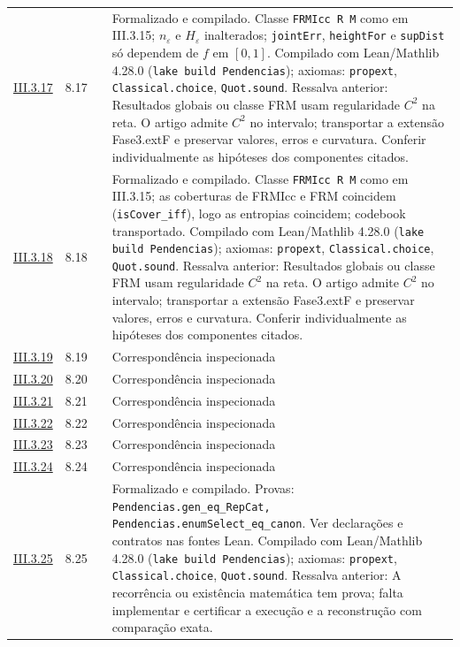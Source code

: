 \documentclass[12pt,a4paper]{article}
\theoremstyle{preciso}
\theoremstyle{definition}
\newcommand{\code}[1]{\nolinkurl{#1}}
\theoremstyle{preciso}
\theoremstyle{preciso}
\theoremstyle{preciso}
\theoremstyle{preciso}
\theoremstyle{definition}
\theoremstyle{preciso}
\theoremstyle{definition}
\theoremstyle{preciso}
\theoremstyle{preciso}
\theoremstyle{definition}
\begin{document}
\begin{singlespace}
\begin{longtable}{@{}p{.11\linewidth}p{.09\linewidth}p{.09\linewidth}p{.59\linewidth}@{}}
\hyperref[map:artigo_2:3.17]{III.3.17} & 8.17 & \pageref{map:artigo_2:3.17} & Formalizado e compilado. Classe \texttt{FRMIcc R M} como em III.3.15; $n_\varepsilon$ e $H_\varepsilon$ inalterados; \texttt{jointErr}, \texttt{heightFor} e \texttt{supDist} só dependem de $f$ em $[0,1]$. Compilado com Lean/Mathlib 4.28.0 (\texttt{lake build Pendencias}); axiomas: \texttt{propext}, \texttt{Classical.choice}, \texttt{Quot.sound}. Ressalva anterior: Resultados globais ou classe FRM usam regularidade $C^2$ na reta. O artigo admite $C^2$ no intervalo; transportar a extensão Fase3.extF e preservar valores, erros e curvatura. Conferir individualmente as hipóteses dos componentes citados.\\[4pt]
\hyperref[map:artigo_2:3.18]{III.3.18} & 8.18 & \pageref{map:artigo_2:3.18} & Formalizado e compilado. Classe \texttt{FRMIcc R M} como em III.3.15; as coberturas de FRMIcc e FRM coincidem (\texttt{isCover\_iff}), logo as entropias coincidem; codebook transportado. Compilado com Lean/Mathlib 4.28.0 (\texttt{lake build Pendencias}); axiomas: \texttt{propext}, \texttt{Classical.choice}, \texttt{Quot.sound}. Ressalva anterior: Resultados globais ou classe FRM usam regularidade $C^2$ na reta. O artigo admite $C^2$ no intervalo; transportar a extensão Fase3.extF e preservar valores, erros e curvatura. Conferir individualmente as hipóteses dos componentes citados.\\[4pt]
\hyperref[map:artigo_2:3.19]{III.3.19} & 8.19 & \pageref{map:artigo_2:3.19} & Correspondência inspecionada\\[4pt]
\hyperref[map:artigo_2:3.20]{III.3.20} & 8.20 & \pageref{map:artigo_2:3.20} & Correspondência inspecionada\\[4pt]
\hyperref[map:artigo_2:3.21]{III.3.21} & 8.21 & \pageref{map:artigo_2:3.21} & Correspondência inspecionada\\[4pt]
\hyperref[map:artigo_2:3.22]{III.3.22} & 8.22 & \pageref{map:artigo_2:3.22} & Correspondência inspecionada\\[4pt]
\hyperref[map:artigo_2:3.23]{III.3.23} & 8.23 & \pageref{map:artigo_2:3.23} & Correspondência inspecionada\\[4pt]
\hyperref[map:artigo_2:3.24]{III.3.24} & 8.24 & \pageref{map:artigo_2:3.24} & Correspondência inspecionada\\[4pt]
\hyperref[map:artigo_2:3.25]{III.3.25} & 8.25 & \pageref{map:artigo_2:3.25} & Formalizado e compilado. Provas: \code{Pendencias.gen_eq_RepCat, Pendencias.enumSelect_eq_canon}. Ver declarações e contratos nas fontes Lean. Compilado com Lean/Mathlib 4.28.0 (\texttt{lake build Pendencias}); axiomas: \texttt{propext}, \texttt{Classical.choice}, \texttt{Quot.sound}. Ressalva anterior: A recorrência ou existência matemática tem prova; falta implementar e certificar a execução e a reconstrução com comparação exata.\\[4pt]

\end{longtable}
\end{singlespace}
\end{document}
